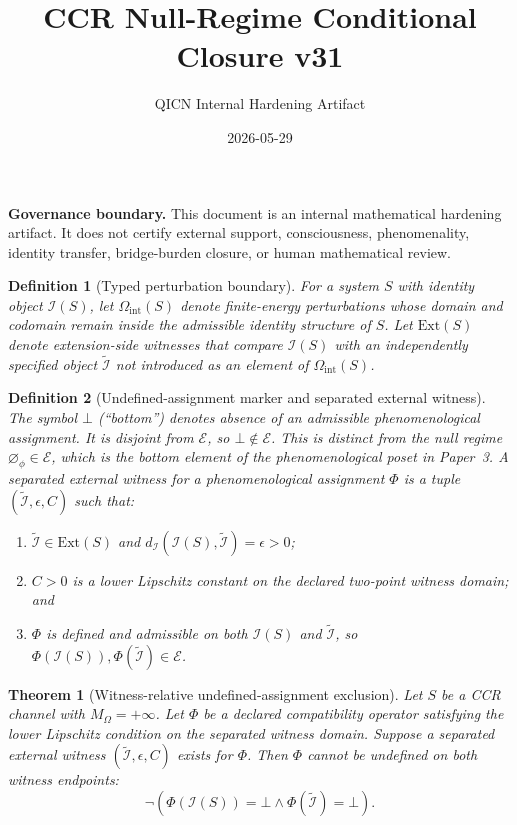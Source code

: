 \documentclass[11pt]{article}
\title{CCR Null-Regime Conditional Closure v31}
\author{QICN Internal Hardening Artifact}
\date{2026-05-29}
\newtheorem{definition}{Definition}
\newtheorem{theorem}{Theorem}
\newcommand{\I}{\mathcal{I}}
\newcommand{\E}{\mathcal{E}}
\newcommand{\MO}{M_\Omega}
\newcommand{\nullphi}{\varnothing_\phi}
\newcommand{\Omegaint}{\Omega_{\mathrm{int}}}
\newcommand{\Ext}{\mathrm{Ext}}
\begin{document}
\maketitle

\noindent\textbf{Governance boundary.}
This document is an internal mathematical hardening artifact. It does not certify external support, consciousness, phenomenality, identity transfer, bridge-burden closure, or human mathematical review.

\begin{definition}[Typed perturbation boundary]
For a system $S$ with identity object $\I(S)$, let $\Omegaint(S)$ denote finite-energy perturbations whose domain and codomain remain inside the admissible identity structure of $S$. Let $\Ext(S)$ denote extension-side witnesses that compare $\I(S)$ with an independently specified object $\tilde{\I}$ not introduced as an element of $\Omegaint(S)$.
\end{definition}

\begin{definition}[Undefined-assignment marker and separated external witness]
The symbol $\bot$ (``bottom'') denotes absence of an admissible phenomenological assignment. It is disjoint from $\E$, so $\bot\notin\E$. This is distinct from the null regime $\nullphi\in\E$, which is the bottom element of the phenomenological poset in Paper~3. A separated external witness for a phenomenological assignment $\Phi$ is a tuple $(\tilde{\I},\epsilon,C)$ such that:
\begin{enumerate}[leftmargin=*]
\item $\tilde{\I}\in\Ext(S)$ and $d_{\I}(\I(S),\tilde{\I})=\epsilon>0$;
\item $C>0$ is a lower Lipschitz constant on the declared two-point witness domain; and
\item $\Phi$ is defined and admissible on both $\I(S)$ and $\tilde{\I}$, so $\Phi(\I(S)),\Phi(\tilde{\I})\in\E$.
\end{enumerate}
\end{definition}

\begin{theorem}[Witness-relative undefined-assignment exclusion]
Let $S$ be a CCR channel with $\MO=+\infty$. Let $\Phi$ be a declared compatibility operator satisfying the lower Lipschitz condition on the separated witness domain. Suppose a separated external witness $(\tilde{\I},\epsilon,C)$ exists for $\Phi$. Then $\Phi$ cannot be undefined on both witness endpoints:
\[
  \neg(\Phi(\I(S))=\bot \wedge \Phi(\tilde{\I})=\bot).
\]
\end{theorem}
\end{document}

